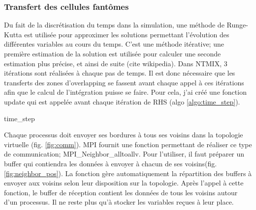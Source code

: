 \subsubsection{Transfert des cellules fantômes}




Du fait de la discrétisation du temps dans la simulation, une méthode de Runge-Kutta est utilisée pour approximer les solutions permettant l'évolution des différentes variables au cours du temps. C'est une méthode itérative; une première estimation de la solution est utilisée pour calculer une seconde estimation plus précise, et ainsi de suite (cite wikipedia). Dans NTMIX, 3 itérations sont réalisées à chaque pas de temps.
Il est donc nécessaire que les transferts des zones d'overlapping se fassent avant chaque appel à ces itérations afin que le calcul de l'intégration puisse se faire. Pour cela, j'ai créé une fonction update qui est appelée avant chaque itération de RHS (algo \ref{algo:time_step}).

\begin{algorithm}
  \caption{time\_step}
  \label{algo:time_step}
  \begin{algorithmic}
  \end{algorithmic}
\end{algorithm}



Chaque processus doit envoyer ses bordures à tous ses voisins dans la topologie virtuelle (fig. \ref{fig:comm}). MPI fournit une fonction permettant de réaliser ce type de communication; MPI\_Neighbor\_alltoallv. Pour l'utiliser, il faut préparer un buffer qui contiendra les données à envoyer à chacun de ses voisins(fig. \ref{fig:neighbor_pos}). La fonction gère automatiquement la répartition des buffers à envoyer aux voisins selon leur disposition sur la topologie. Après l'appel à cette fonction, le buffer de réception contient les données de tous les voisins autour d'un processus. Il ne reste plus qu'à stocker les variables reçues à leur place. 


